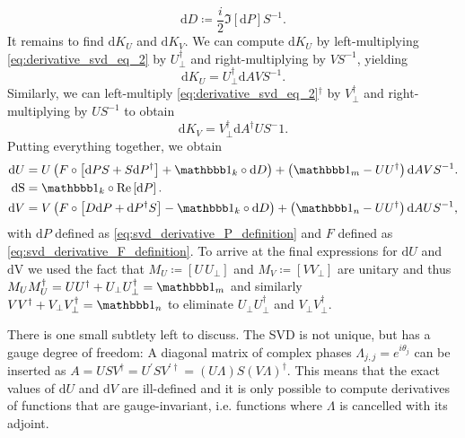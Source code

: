 \begin{equation}
	\text{d}D \coloneqq \frac{i}{2}\Im\left[\text{d}P\right]S^{-1}.
\end{equation}
It remains to find $\text{d}K_U$ and $\text{d}K_V$. We can compute $\text{d}K_U$ by left-multiplying \eqref{eq:derivative_svd_eq_2} by $U_\perp^\dagger$ and right-multiplying by $VS^{-1}$, yielding
\begin{equation}
	\label{eq:derivative_svd_eq_7}
	\text{d}K_U = U_\perp^\dagger \text{d}AVS^{-1}.
\end{equation}
Similarly, we can left-multiply \eqref{eq:derivative_svd_eq_2}$^\dagger$ by $V_\perp^\dagger$ and right-multiplying by $US^{-1}$ to obtain
\begin{equation}
	\label{eq:derivative_svd_eq_8}
	\text{d}K_V = V_\perp^\dagger\text{d}A^\dagger US^-1.
\end{equation}
Putting everything together, we obtain
\begin{equation}
	\label{eq:final_solution_svd_derivative}
	\begin{split}
		\text{d}U &= U\left(F\circ\left[\text{d}PS+S\text{d}P^\dagger\right] + \id_k\circ\text{d}D\right) + \left(\id_m-UU^\dagger\right)\text{d}AVS^{-1}. \\
		\text{dS} &= \id_k\circ\Re\left[\text{d}P\right]. \\
		\text{d}V &= V\left(F\circ\left[D\text{d}P+\text{d}P^\dagger S\right] - \id_k\circ\text{d}D\right) + \left(\id_n-UU^\dagger\right)\text{d}AUS^{-1},
	\end{split}
\end{equation}
with $\text{d}P$ defined as \eqref{eq:svd_derivative_P_definition} and $F$ defined as \eqref{eq:svd_derivative_F_definition}. To arrive at the final expressions for $\text{d}U$ and $\text{dV}$ we used the fact that $M_U \coloneqq \left[U\,U_\perp\right]$ and $M_V \coloneqq \left[V V_\perp\right]$ are unitary and thus $M_UM_U^\dagger = UU^\dagger + U_\perp U_\perp^\dagger = \id_m$ and similarly $VV^\dagger + V_\perp V_\perp^\dagger = \id_n$ to eliminate $U_\perp U_\perp^\dagger$ and $V_\perp V_\perp^\dagger$. \par
There is one small subtlety left to discuss. The SVD is not unique, but has a gauge degree of freedom: A diagonal matrix of complex phases $\Lambda_{j,j} = e^{i\theta_j}$ can be inserted as $A = USV^\dagger = U^\prime S V^{\prime\dagger} = (U\Lambda)S(V\Lambda)^\dagger$. This means that the exact values of $\text{d}U$ and $\text{d}V$ are ill-defined and it is only possible to compute derivatives of functions that are gauge-invariant, i.e. functions where $\Lambda$ is cancelled with its adjoint.
%
%
